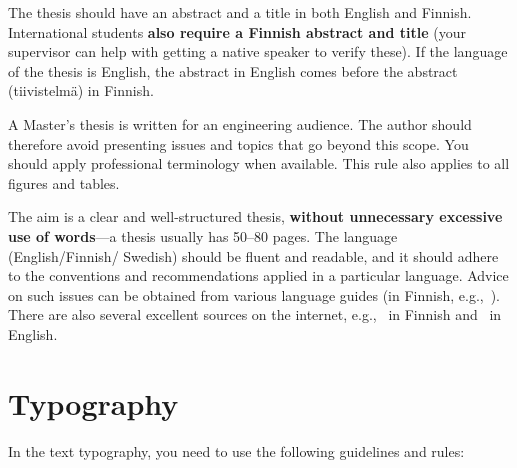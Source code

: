 The thesis should have an abstract and a title in both English and
Finnish. International students \textbf{also require a Finnish abstract and title} (your supervisor can help with getting a native speaker to verify these).
If the language of the thesis is English, the abstract in English comes
before the abstract (tiivistelmä) in Finnish.

A Master’s thesis is written for an engineering audience. The author
should therefore avoid presenting issues and topics that go beyond
this scope. You should apply professional terminology when available.
This rule also applies to all figures and tables.

The aim is a clear and well-structured thesis, \textbf{without
unnecessary excessive use of words}---a thesis usually has 50--80
pages. The language (English/Finnish/ Swedish) should be fluent and
readable, and it should adhere to the conventions and recommendations
applied in a particular language. Advice on such issues can be
obtained from various language guides (in Finnish,
e.g.,~\cite{maamies}). There are also several excellent sources on
the internet, e.g.,~\cite{korpela, kielitoimisto} in Finnish
and~\cite{reportwriting, englishlanguage} in English.

\section{Typography}

In the text typography, you need to use the following guidelines and rules:

